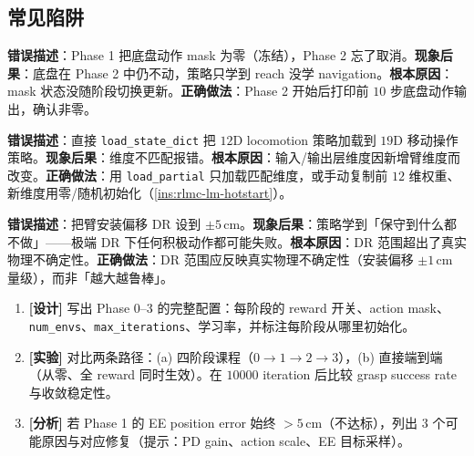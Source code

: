 \subsection{常见陷阱}
\label{sec:rlmc-lm-curr-pitfalls}

\begin{pitfall}
\textbf{错误描述}：Phase 1 把底盘动作 mask 为零（冻结），Phase 2 忘了取消。\textbf{现象后果}：底盘在 Phase 2 中仍不动，策略只学到 reach 没学 navigation。\textbf{根本原因}：mask 状态没随阶段切换更新。\textbf{正确做法}：Phase 2 开始后打印前 $10$ 步底盘动作输出，确认非零。
\end{pitfall}

\begin{pitfall}
\textbf{错误描述}：直接 \verb|load_state_dict| 把 $12$D locomotion 策略加载到 $19$D 移动操作策略。\textbf{现象后果}：维度不匹配报错。\textbf{根本原因}：输入/输出层维度因新增臂维度而改变。\textbf{正确做法}：用 \verb|load_partial| 只加载匹配维度，或手动复制前 $12$ 维权重、新维度用零/随机初始化（\cref{ins:rlmc-lm-hotstart}）。
\end{pitfall}

\begin{pitfall}
\textbf{错误描述}：把臂安装偏移 DR 设到 $\pm5\,$cm。\textbf{现象后果}：策略学到「保守到什么都不做」——极端 DR 下任何积极动作都可能失败。\textbf{根本原因}：DR 范围超出了真实物理不确定性。\textbf{正确做法}：DR 范围应反映真实物理不确定性（安装偏移 $\pm1\,$cm 量级），而非「越大越鲁棒」。
\end{pitfall}

\begin{practice}[练习·四阶段课程]
\begin{enumerate}
\item \textbf{[设计]} 写出 Phase 0--3 的完整配置：每阶段的 reward 开关、action mask、\verb|num_envs|、\verb|max_iterations|、学习率，并标注每阶段从哪里初始化。
\item \textbf{[实验]} 对比两条路径：(a) 四阶段课程（$0\to1\to2\to3$），(b) 直接端到端（从零、全 reward 同时生效）。在 $10000$ iteration 后比较 grasp success rate 与收敛稳定性。
\item \textbf{[分析]} 若 Phase 1 的 EE position error 始终 $>5\,$cm（不达标），列出 $3$ 个可能原因与对应修复（提示：PD gain、action scale、EE 目标采样）。
\end{enumerate}
\end{practice}

